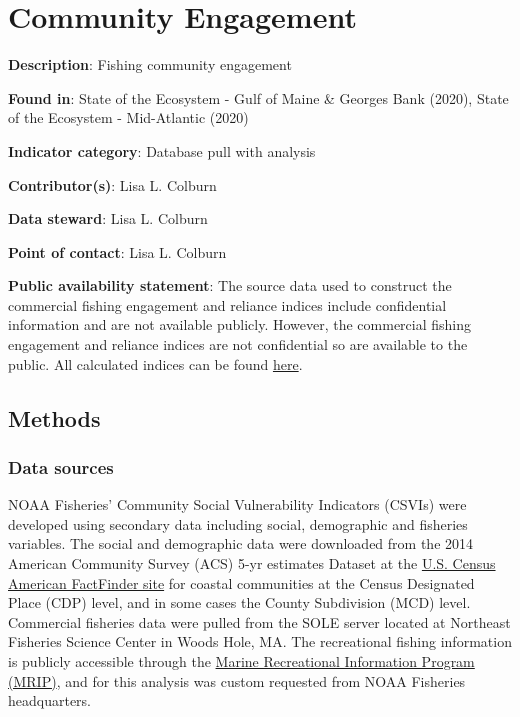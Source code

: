 \documentclass[
]{book}
\begin{document}
\hypertarget{community-engagement}{%
\chapter{Community Engagement}\label{community-engagement}}

\textbf{Description}: Fishing community engagement

\textbf{Found in}: State of the Ecosystem - Gulf of Maine \& Georges Bank (2020), State of the Ecosystem - Mid-Atlantic (2020)

\textbf{Indicator category}: Database pull with analysis

\textbf{Contributor(s)}: Lisa L. Colburn

\textbf{Data steward}: Lisa L. Colburn

\textbf{Point of contact}: Lisa L. Colburn

\textbf{Public availability statement}: The source data used to construct the commercial fishing engagement and reliance indices include confidential information and are not available publicly. However, the commercial fishing engagement and reliance indices are not confidential so are available to the public. All calculated indices can be found \href{https://www.st.nmfs.noaa.gov/humandimensions/social-indicators/map}{here}.

\hypertarget{methods-10}{%
\section{Methods}\label{methods-10}}

\hypertarget{data-sources-10}{%
\subsection{Data sources}\label{data-sources-10}}

NOAA Fisheries' Community Social Vulnerability Indicators (CSVIs) were developed using secondary data including social, demographic and fisheries variables. The social and demographic data were downloaded from the 2014 American Community Survey (ACS) 5-yr estimates Dataset at the \href{https://www.census.gov/programs-surveys/acs/}{U.S. Census American FactFinder site} for coastal communities at the Census Designated Place (CDP) level, and in some cases the County Subdivision (MCD) level. Commercial fisheries data were pulled from the SOLE server located at Northeast Fisheries Science Center in Woods Hole, MA. The recreational fishing information is publicly accessible through the \href{https://www.st.nmfs.noaa.gov/recreational-fisheries/MRIP/}{Marine Recreational Information Program (MRIP)}, and for this analysis was custom requested from NOAA Fisheries headquarters.
\end{document}
